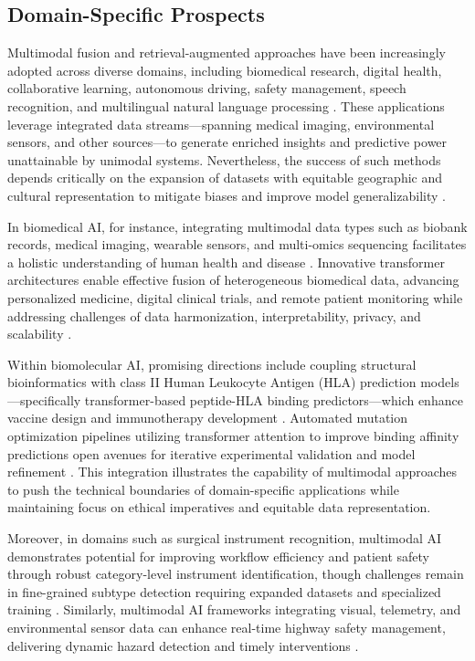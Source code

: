 \documentclass[sigconf]{acmart}
\begin{document}
\subsection{Domain-Specific Prospects}

Multimodal fusion and retrieval-augmented approaches have been increasingly adopted across diverse domains, including biomedical research, digital health, collaborative learning, autonomous driving, safety management, speech recognition, and multilingual natural language processing \cite{ref1,ref2,ref12,ref26,ref27,ref29,ref31,ref32}. These applications leverage integrated data streams—spanning medical imaging, environmental sensors, and other sources—to generate enriched insights and predictive power unattainable by unimodal systems. Nevertheless, the success of such methods depends critically on the expansion of datasets with equitable geographic and cultural representation to mitigate biases and improve model generalizability \cite{ref12,ref26,ref27,ref30}.

In biomedical AI, for instance, integrating multimodal data types such as biobank records, medical imaging, wearable sensors, and multi-omics sequencing facilitates a holistic understanding of human health and disease \cite{ref12}. Innovative transformer architectures enable effective fusion of heterogeneous biomedical data, advancing personalized medicine, digital clinical trials, and remote patient monitoring while addressing challenges of data harmonization, interpretability, privacy, and scalability \cite{ref12}. 

Within biomolecular AI, promising directions include coupling structural bioinformatics with class II Human Leukocyte Antigen (HLA) prediction models—specifically transformer-based peptide-HLA binding predictors—which enhance vaccine design and immunotherapy development \cite{ref19}. Automated mutation optimization pipelines utilizing transformer attention to improve binding affinity predictions open avenues for iterative experimental validation and model refinement \cite{ref19}. This integration illustrates the capability of multimodal approaches to push the technical boundaries of domain-specific applications while maintaining focus on ethical imperatives and equitable data representation.

Moreover, in domains such as surgical instrument recognition, multimodal AI demonstrates potential for improving workflow efficiency and patient safety through robust category-level instrument identification, though challenges remain in fine-grained subtype detection requiring expanded datasets and specialized training \cite{ref26}. Similarly, multimodal AI frameworks integrating visual, telemetry, and environmental sensor data can enhance real-time highway safety management, delivering dynamic hazard detection and timely interventions \cite{ref27}.
\end{document}
